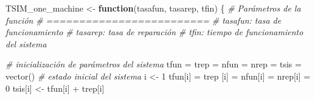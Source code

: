 \documentclass[
]{book}
\newenvironment{Shaded}{\begin{snugshade}}{\end{snugshade}}
\newcommand{\CommentTok}[1]{\textcolor[rgb]{0.56,0.35,0.01}{\textit{#1}}}
\newcommand{\ControlFlowTok}[1]{\textcolor[rgb]{0.13,0.29,0.53}{\textbf{#1}}}
\newcommand{\DecValTok}[1]{\textcolor[rgb]{0.00,0.00,0.81}{#1}}
\newcommand{\FunctionTok}[1]{\textcolor[rgb]{0.00,0.00,0.00}{#1}}
\newcommand{\NormalTok}[1]{#1}
\newcommand{\OtherTok}[1]{\textcolor[rgb]{0.56,0.35,0.01}{#1}}
\newcommand{\SpecialCharTok}[1]{\textcolor[rgb]{0.00,0.00,0.00}{#1}}
\theoremstyle{definition}
\theoremstyle{definition}
\theoremstyle{definition}
\theoremstyle{definition}
\theoremstyle{remark}
\begin{document}
\begin{Shaded}
\begin{Highlighting}[]
\NormalTok{TSIM\_one\_machine }\OtherTok{\textless{}{-}} \ControlFlowTok{function}\NormalTok{(tasafun, tasarep, tfin)}
\NormalTok{\{}
  \CommentTok{\# Parámetros de la función}
  \CommentTok{\# =========================}
  \CommentTok{\# tasafun: tasa de funcionamiento}
  \CommentTok{\# tasarep: tasa de reparación}
  \CommentTok{\# tfin: tiempo de funcionamiento del sistema}
  
  \CommentTok{\# inicialización de parámetros del sistema }
\NormalTok{  tfun }\OtherTok{=}\NormalTok{ trep }\OtherTok{=}\NormalTok{ nfun }\OtherTok{=}\NormalTok{ nrep }\OtherTok{=}\NormalTok{ tsis }\OtherTok{=} \FunctionTok{vector}\NormalTok{()}
  \CommentTok{\# estado inicial del sistema}
\NormalTok{  i }\OtherTok{\textless{}{-}} \DecValTok{1}
\NormalTok{  tfun[i] }\OtherTok{=}\NormalTok{ trep [i] }\OtherTok{=}\NormalTok{ nfun[i] }\OtherTok{=}\NormalTok{ nrep[i] }\OtherTok{=} \DecValTok{0}
\NormalTok{  tsis[i] }\OtherTok{\textless{}{-}}\NormalTok{ tfun[i] }\SpecialCharTok{+}\NormalTok{ trep[i]}
  

\end{Highlighting}
\end{Shaded}
\end{document}
